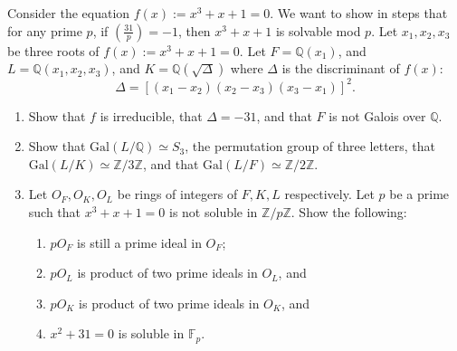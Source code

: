 \begin{exercise}
\label{algebra:2015:3}
Consider the equation $f(x) := x^3 + x + 1 = 0$. We want to show in steps that for any prime $p$, if $\left( \frac{31}{p} \right) = -1$, then $x^3 + x + 1$ is solvable mod $p$.
Let $x_1, x_2, x_3$ be three roots of $f(x) := x^3 + x + 1 = 0$. Let $F = \mathbb{Q}(x_1)$, and $L = \mathbb{Q}(x_1, x_2, x_3)$, and $K = \mathbb{Q}(\sqrt{\Delta})$ where $\Delta$ is the discriminant of $f(x)$:
\[
\Delta = [(x_1 - x_2)(x_2 - x_3)(x_3 - x_1)]^2.
\]
\begin{enumerate}
    \item Show that $f$ is irreducible, that $\Delta = -31$, and that $F$ is not Galois over $\mathbb{Q}$.
    \item Show that $\mathrm{Gal}(L / \mathbb{Q}) \simeq S_3$, the permutation group of three letters, that $\mathrm{Gal}(L / K) \simeq \mathbb{Z} / 3\mathbb{Z}$, and that $\mathrm{Gal}(L / F) \simeq \mathbb{Z} / 2\mathbb{Z}$.
    \item Let $O_F, O_K, O_L$ be rings of integers of $F, K, L$ respectively. Let $p$ be a prime such that $x^3 + x + 1 = 0$ is not soluble in $\mathbb{Z} / p\mathbb{Z}$. Show the following:
    \begin{enumerate}
        \item $pO_F$ is still a prime ideal in $O_F$;
        \item $pO_L$ is product of two prime ideals in $O_L$, and
        \item $pO_K$ is product of two prime ideals in $O_K$, and
        \item $x^2 + 31 = 0$ is soluble in $\mathbb{F}_p$.
    \end{enumerate}
\end{enumerate}
\end{exercise}

